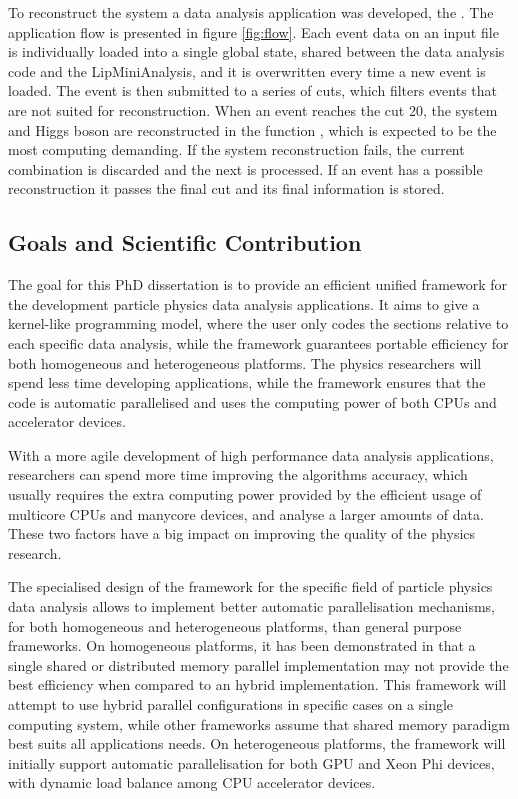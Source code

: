 To reconstruct the \ttH system a data analysis application was developed, the \tth. The application flow is presented in figure \ref{fig:flow}. Each event data on an input file is individually loaded into a single global state, shared between the data analysis code and the LipMiniAnalysis, and it is overwritten every time a new event is loaded. The event is then submitted to a series of cuts, which filters events that are not suited for reconstruction. When an event reaches the cut 20, the \ttbar system and Higgs boson are reconstructed in the function \ttDilepKinFit, which is expected to be the most computing demanding. If the \ttbar system reconstruction fails, the current combination is discarded and the next is processed. If an event has a possible reconstruction it passes the final cut and its final information is stored.

\subsection{Goals and Scientific Contribution}
\label{goals}

The goal for this PhD dissertation is to provide an efficient unified framework for the development particle physics data analysis applications. It aims to give a kernel-like programming model, where the user only codes the sections relative to each specific data analysis, while the framework guarantees portable efficiency for both homogeneous and heterogeneous platforms. The physics researchers will spend less time developing applications, while the framework ensures that the code is automatic parallelised and uses the computing power of both CPUs and accelerator devices.

With a more agile development of high performance data analysis applications, researchers can spend more time improving the algorithms accuracy, which usually requires the extra computing power provided by the efficient usage of multicore CPUs and manycore devices, and analyse a larger amounts of data. These two factors have a big impact on improving the quality of the physics research.

The specialised design of the framework for the specific field of particle physics data analysis allows to implement better automatic parallelisation mechanisms, for both homogeneous and heterogeneous platforms, than general purpose frameworks. On homogeneous platforms, it has been demonstrated in \cite{paperAMP,Msc:AMP} that a single shared or distributed memory parallel implementation may not provide the best efficiency when compared to an hybrid implementation. This framework will attempt to use hybrid parallel configurations in specific cases on a single computing system, while other frameworks assume that shared memory paradigm best suits all applications needs. On heterogeneous platforms, the framework will initially support automatic parallelisation for both \nvidia GPU and \intel Xeon Phi devices, with dynamic load balance among CPU accelerator devices.
